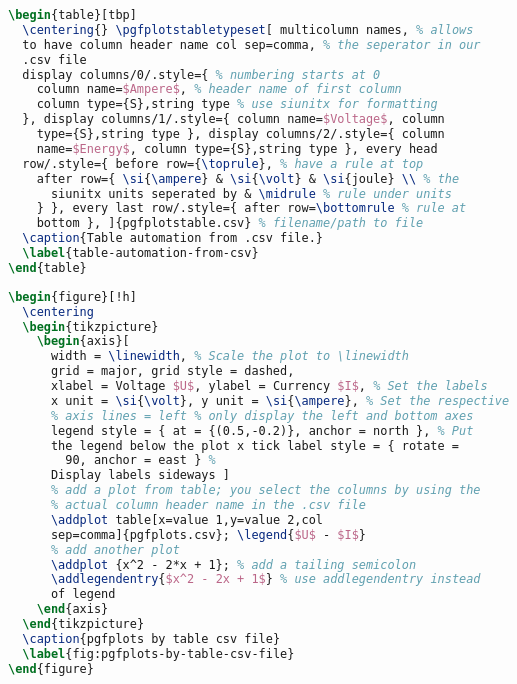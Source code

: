 \begin{appendices}
\begin{minipage}[tbp]{1.0\linewidth}
\begin{lstlisting}[language=TeX,caption={pgfplotstable
template},label={lst:pgfplotstable-template},basicstyle=\scriptsize\ttfamily,linewidth=\textwidth]
\begin{table}[tbp]
  \centering{} \pgfplotstabletypeset[ multicolumn names, % allows
  to have column header name col sep=comma, % the seperator in our
  .csv file
  display columns/0/.style={ % numbering starts at 0
    column name=$Ampere$, % header name of first column
    column type={S},string type % use siunitx for formatting
  }, display columns/1/.style={ column name=$Voltage$, column
    type={S},string type }, display columns/2/.style={ column
    name=$Energy$, column type={S},string type }, every head
  row/.style={ before row={\toprule}, % have a rule at top
    after row={ \si{\ampere} & \si{\volt} & \si{joule} \\ % the
      siunitx units seperated by & \midrule % rule under units
    } }, every last row/.style={ after row=\bottomrule % rule at
    bottom }, ]{pgfplotstable.csv} % filename/path to file
  \caption{Table automation from .csv file.}
  \label{table-automation-from-csv}
\end{table}
\end{lstlisting}    
\end{minipage}

\begin{minipage}[tbp]{1.0\linewidth}
\begin{lstlisting}[language=TeX,caption={pgfplots
template},label={lst:pgfplots-template},basicstyle=\tiny\ttfamily,linewidth=\textwidth]
\begin{figure}[!h]
  \centering
  \begin{tikzpicture}
    \begin{axis}[
      width = \linewidth, % Scale the plot to \linewidth
      grid = major, grid style = dashed,
      xlabel = Voltage $U$, ylabel = Currency $I$, % Set the labels
      x unit = \si{\volt}, y unit = \si{\ampere}, % Set the respective units
      % axis lines = left % only display the left and bottom axes
      legend style = { at = {(0.5,-0.2)}, anchor = north }, % Put
      the legend below the plot x tick label style = { rotate =
        90, anchor = east } %
      Display labels sideways ]
      % add a plot from table; you select the columns by using the
      % actual column header name in the .csv file
      \addplot table[x=value 1,y=value 2,col
      sep=comma]{pgfplots.csv}; \legend{$U$ - $I$}
      % add another plot
      \addplot {x^2 - 2*x + 1}; % add a tailing semicolon
      \addlegendentry{$x^2 - 2x + 1$} % use addlegendentry instead
      of legend
    \end{axis}
  \end{tikzpicture}
  \caption{pgfplots by table csv file}
  \label{fig:pgfplots-by-table-csv-file}
\end{figure}
\end{lstlisting}
\end{minipage}

\newpage{}
\listoffigures{}
\listoftables{}
\lstlistoflistings{}

\end{appendices}

